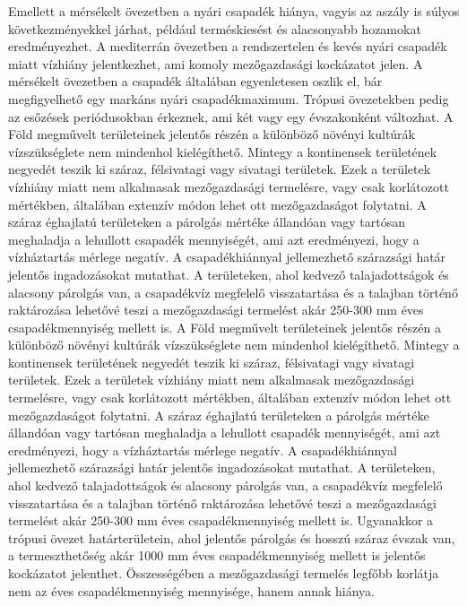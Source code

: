 \documentclass[a4paper,oneside,onecolumn,12pt]{LegrandOrangeBook}
\begin{document}
Emellett a mérsékelt övezetben a nyári csapadék hiánya, vagyis az aszály is súlyos következményekkel járhat, például terméskiesést és alacsonyabb hozamokat eredményezhet. A mediterrán övezetben a rendszertelen és kevés nyári csapadék miatt vízhiány jelentkezhet, ami komoly mezőgazdasági kockázatot jelen. A mérsékelt övezetben a csapadék általában egyenletesen oszlik el, bár megfigyelhető egy markáns nyári csapadékmaximum. Trópusi övezetekben pedig az esőzések periódusokban érkeznek, ami két vagy egy évszakonként változhat.
A Föld megművelt területeinek jelentős részén a különböző növényi kultúrák vízszükséglete nem mindenhol kielégíthető. Mintegy a kontinensek területének negyedét teszik ki száraz, félsivatagi vagy sivatagi területek. Ezek a területek vízhiány miatt nem alkalmasak mezőgazdasági termelésre, vagy csak korlátozott mértékben, általában extenzív módon lehet ott mezőgazdaságot folytatni. 
A száraz éghajlatú területeken a párolgás mértéke állandóan vagy tartósan meghaladja a lehullott csapadék mennyiségét, ami azt eredményezi, hogy a vízháztartás mérlege negatív. A csapadékhiánnyal jellemezhető szárazsági határ jelentős ingadozásokat mutathat. A területeken, ahol kedvező talajadottságok és alacsony párolgás van, a csapadékvíz megfelelő visszatartása és a talajban történő raktározása lehetővé teszi a mezőgazdasági termelést akár 250-300 mm éves csapadékmennyiség mellett is. 
A Föld megművelt területeinek jelentős részén a különböző növényi kultúrák vízszükséglete nem mindenhol kielégíthető. Mintegy a kontinensek területének negyedét teszik ki száraz, félsivatagi vagy sivatagi területek. Ezek a területek vízhiány miatt nem alkalmasak mezőgazdasági termelésre, vagy csak korlátozott mértékben, általában extenzív módon lehet ott mezőgazdaságot folytatni. 
A száraz éghajlatú területeken a párolgás mértéke állandóan vagy tartósan meghaladja a lehullott csapadék mennyiségét, ami azt eredményezi, hogy a vízháztartás mérlege negatív. A csapadékhiánnyal jellemezhető szárazsági határ jelentős ingadozásokat mutathat. A területeken, ahol kedvező talajadottságok és alacsony párolgás van, a csapadékvíz megfelelő visszatartása és a talajban történő raktározása lehetővé teszi a mezőgazdasági termelést akár 250-300 mm éves csapadékmennyiség mellett is.
Ugyanakkor a trópusi övezet határterületein, ahol jelentős párolgás és hosszú száraz évszak van, a termeszthetőség akár 1000 mm éves csapadékmennyiség mellett is jelentős kockázatot jelenthet. Összességében a mezőgazdasági termelés legfőbb korlátja nem az éves csapadékmennyiség mennyisége, hanem annak hiánya.
\end{document}
